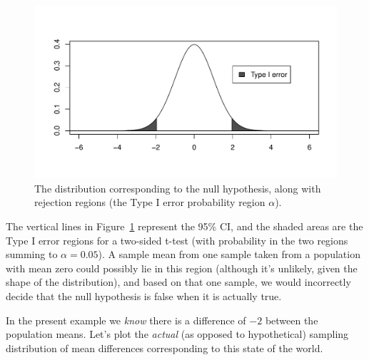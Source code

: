 \documentclass[12pt]{book}\usepackage[]{graphicx}\usepackage[]{color}
\makeatletter
\def\maxwidth{ %
  \ifdim\Gin@nat@width>\linewidth
    \linewidth
  \else
    \Gin@nat@width
  \fi
}
\newenvironment{knitrout}{}{} %
\makeatother
\begin{document}
\begin{figure}[!htbp]
  \centering
\begin{knitrout}
\color{fgcolor}
\includegraphics[width=\maxwidth]{figure/unnamed-chunk-60-1} 

\end{knitrout}
  \caption{The distribution corresponding to the null hypothesis,
    along with rejection regions (the Type I error probability region $\alpha$).}
  \label{fig:nullhyprejectionregion}
\end{figure}

The vertical lines in Figure~\ref{fig:nullhyprejectionregion}
represent the 95\% CI, and the shaded areas are the Type I error
regions for a two-sided t-test (with probability in the two regions
summing to $\alpha = 0.05$). A sample mean from one sample taken from
a population with mean zero could possibly lie in this region
(although it's unlikely, given the shape of the distribution), and
based on that one sample, we would incorrectly decide that the null
hypothesis is false when it is actually true. 

In the present example we \emph{know} there is a difference of
$-2$ between the population means. Let's plot the \emph{actual} (as opposed to hypothetical) sampling distribution of mean differences corresponding to this state of the world.
\end{document}
